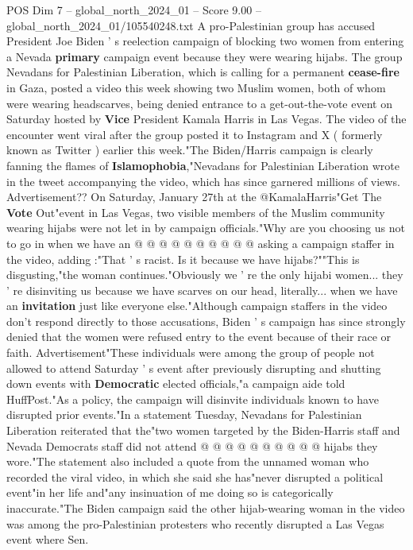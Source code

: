 \begin{textsample}{POS Dim 7 – global\_north\_2024\_01 – Score 9.00 – global\_north\_2024\_01/105540248.txt}  \label{ex:f7_pos_190}
A pro-Palestinian group has accused President Joe Biden ' s reelection campaign of blocking two women from entering a Nevada \textbf{primary} campaign event because they were wearing hijabs.
The group Nevadans for Palestinian Liberation, which is calling for a permanent \textbf{cease-fire} in Gaza, posted a video this week showing two Muslim women, both of whom were wearing headscarves, being denied entrance to a get-out-the-vote event on Saturday hosted by \textbf{Vice} President Kamala Harris in Las Vegas.
The video of the encounter went viral after the group posted it to Instagram and X ( formerly known as Twitter ) earlier this week."The Biden/Harris campaign is clearly fanning the flames of \textbf{Islamophobia},"Nevadans for Palestinian Liberation wrote in the tweet accompanying the video, which has since garnered millions of views.
Advertisement??
On Saturday, January 27th at the @KamalaHarris"Get The \textbf{Vote} Out"event in Las Vegas, two visible members of the Muslim community wearing hijabs were not let in by campaign officials."Why are you choosing us not to go in when we have an @ @ @ @ @ @ @ @ @ @ asking a campaign staffer in the video, adding :"That ' s racist.
Is it because we have hijabs?""This is disgusting,"the woman continues."Obviously we ' re the only hijabi women... they ' re disinviting us because we have scarves on our head, literally... when we have an \textbf{invitation} just like everyone else."Although campaign staffers in the video don't respond directly to those accusations, Biden ' s campaign has since strongly denied that the women were refused entry to the event because of their race or faith.
Advertisement"These individuals were among the group of people not allowed to attend Saturday ' s event after previously disrupting and shutting down events with \textbf{Democratic} elected officials,"a campaign aide told HuffPost."As a policy, the campaign will disinvite individuals known to have disrupted prior events."In a statement Tuesday, Nevadans for Palestinian Liberation reiterated that the"two women targeted by the Biden-Harris staff and Nevada Democrats staff did not attend @ @ @ @ @ @ @ @ @ @ hijabs they wore."The statement also included a quote from the unnamed woman who recorded the viral video, in which she said she has"never disrupted a political event"in her life and"any insinuation of me doing so is categorically inaccurate."The Biden campaign said the other hijab-wearing woman in the video was among the pro-Palestinian protesters who recently disrupted a Las Vegas event where Sen.

\end{textsample}
